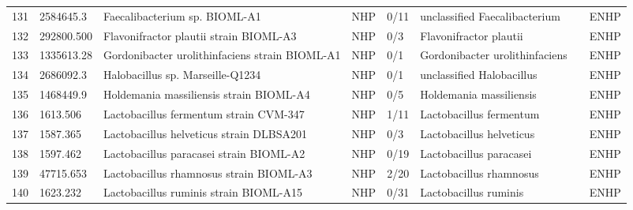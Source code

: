 \begin{longtable}{llllllll}
131 &     2584645.3 &                                            Faecalibacterium sp. BIOML-A1 &   NHP &      0/11 &                  unclassified Faecalibacterium &                      \cite{poyet2019library,benevides2017new} &  ENHP \\
132 &    292800.500 &                                   Flavonifractor plautii strain BIOML-A3 &   NHP &       0/3 &                         Flavonifractor plautii &                         \cite{poyet2019library,ogita2020oral} &  ENHP \\
133 &    1335613.28 &                           Gordonibacter urolithinfaciens strain BIOML-A1 &   NHP &       0/1 &                 Gordonibacter urolithinfaciens &                  \cite{poyet2019library,toney2020introducing} &  ENHP \\
134 &     2686092.3 &                                         Halobacillus sp. Marseille-Q1234 &   NHP &       0/1 &                      unclassified Halobacillus &                                         \cite{joshi2013draft} &  ENHP \\
135 &     1468449.9 &                                  Holdemania massiliensis strain BIOML-A4 &   NHP &       0/5 &                        Holdemania massiliensis &                         \cite{poyet2019library,mishra2013non} &  ENHP \\
136 &      1613.506 &                                   Lactobacillus fermentum strain CVM-347 &   NHP &      1/11 &                        Lactobacillus fermentum &                            \cite{naghmouchi2020lactobacillus} &  ENHP \\
137 &      1587.365 &                                 Lactobacillus helveticus strain DLBSA201 &   NHP &       0/3 &                       Lactobacillus helveticus &                                    \cite{taverniti2012health} &  ENHP \\
138 &      1597.462 &                                  Lactobacillus paracasei strain BIOML-A2 &   NHP &      0/19 &                        Lactobacillus paracasei &                 \cite{poyet2019library,choi2020lactobacillus} &  ENHP \\
139 &     47715.653 &                                  Lactobacillus rhamnosus strain BIOML-A3 &   NHP &      2/20 &                        Lactobacillus rhamnosus &   \cite{poyet2019library,westerik2018lactobacillus,47715.653} &  ENHP \\
140 &      1623.232 &                                   Lactobacillus ruminis strain BIOML-A15 &   NHP &      0/31 &                          Lactobacillus ruminis &                     \cite{poyet2019library,yu2017comparative} &  ENHP \\

\end{longtable}
